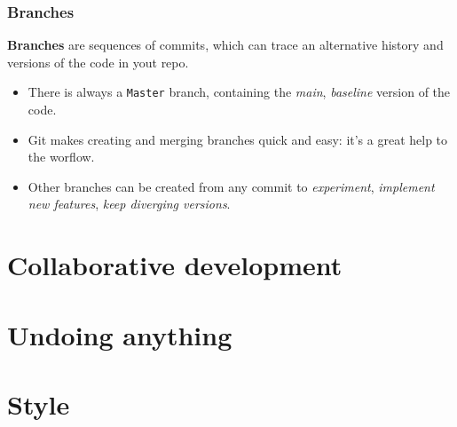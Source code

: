 \documentclass[10pt,svgnames,handout]{beamer}
\begin{document}
\begin{frame}
\frametitle{Branches}

\textbf{Branches} are sequences of commits, which can trace an alternative history and versions of the code in yout repo.\\
\begin{itemize}
  \item There is always a \lstinline{Master} branch, containing the \emph{main}, \emph{baseline} version of the code.
  \item Git makes creating and merging branches quick and easy: it's a great help to the worflow.
  \item Other branches can be created from any commit to \emph{experiment}, \emph{implement new features}, \emph{keep diverging versions}.

\end{itemize}
\pause


\end{frame}





\section{Collaborative development}


\section{Undoing anything}


\section{Style}
\end{document}

